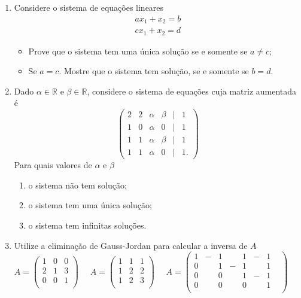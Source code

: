 \documentclass{article}
\theoremstyle{plain}
\theoremstyle{obs}
\numberwithin{equation}{section}
\begin{document}
\begin{enumerate}
 \item Considere o sistema de equações lineares
       $$
       \begin{matrix}
       ax_1 + x_2 = b\\
       cx_1 + x_2 = d
       \end{matrix}
       $$
     \begin{itemize}
      \item Prove que o sistema tem uma única solução se e somente se $a\neq c$;
      \item Se $a=c$. Mostre que o sistema tem solução, se e somente se $b=d$.
     \end{itemize}
  
  \item Dado $\alpha \in \mathbb{R}$ e $\beta \in \mathbb{R}$, considere o sistema de equações cuja matriz aumentada é      
       $$
       \begin{pmatrix}
       2 & 2 & \alpha & \beta & | & 1\\
       1 & 0 & \alpha & 0     & | & 1\\
       1 & 1 & \alpha & \beta & | & 1\\
       1 & 1 & \alpha & 0     & | & 1.
       \end{pmatrix}
       $$
     Para quais valores de $\alpha$ e $\beta$ 
        \begin{enumerate}
         \item o sistema não tem solução;
         \item o sistema tem uma única solução; 
         \item o sistema tem infinitas soluções.
        \end{enumerate}
  
  \item Utilize a eliminação de Gauss-Jordan para calcular a inversa de $A$
  \newline
       $
       A=
       \begin{pmatrix}
       1 & 0 & 0 \\
       2 & 1 & 3 \\
       0 & 0 & 1 \\
       \end{pmatrix}
       $
       \ \ 
       $
       A=
       \begin{pmatrix}
       1 & 1 & 1 \\
       1 & 2 & 2 \\
       1 & 2 & 3 \\
       \end{pmatrix}
       $
       \ \ 
       $
       A=
       \begin{pmatrix}
       1 &-&1& &1& -&1&\\
       0 & &1&-&1&  &1&\\
       0 & &0& &1& -&1&\\
       0 & &0& &0&  &1&\\
       \end{pmatrix}
       $
   

\end{enumerate}
\end{document}
